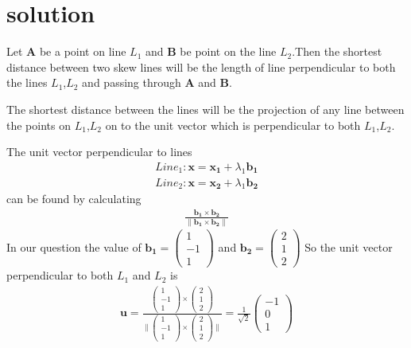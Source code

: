 \documentclass[journal,12pt,twocolumn]{IEEEtran}
\newcommand{\norm}[1]{\| #1 \|}
\begin{document}
\section{solution}
Let $\bm{A}$ be a point on line $L_1$ and $\bm{B}$ be point on the line $L_2$.Then the shortest distance between two skew lines will be the length of line perpendicular to both the lines $L_1$,$L_2$ and passing through $\bm{A}$ and $\bm{B}$.\par
The shortest distance between the lines will be the projection of any line between the points on $L_1$,$L_2$ on to the unit vector which is perpendicular to both $L_1$,$L_2$.\par
The unit vector perpendicular to lines \\
\begin{align}
    Line_1\colon \bm{x}=\bm{x_1}+\lambda_1\bm{b_1}\\
    Line_2\colon \bm{x}=\bm{x_2}+\lambda_1\bm{b_2}
\end{align}
can be found by calculating
\begin{align}
    \frac{\bm{b_1}\times\bm{b_2}}{\norm{\bm{b_1}\times\bm{b_2}}}
\end{align}
In our question the value of $\bm{b_1}=\begin{pmatrix}1\\-1\\1\end{pmatrix}$ and $\bm{b_2}=\begin{pmatrix}2\\1\\2\end{pmatrix}$
So the unit vector perpendicular to both $L_1$ and $L_2$ is
\begin{align}
    \bm{u}=\frac{\begin{pmatrix}1\\-1\\1\end{pmatrix}\times\begin{pmatrix}2\\1\\2\end{pmatrix}}{\norm{\begin{pmatrix}1\\-1\\1\end{pmatrix}\times\begin{pmatrix}2\\1\\2\end{pmatrix}}}=\frac{1}{\sqrt{2}}\begin{pmatrix}-1\\0\\1\end{pmatrix}
\end{align}
\end{document}
